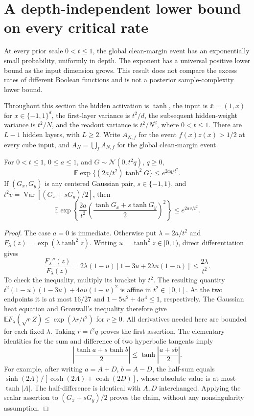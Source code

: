 \section{A depth-independent lower bound on every critical rate}
\label{sec:critical-universal-baseline}

At every prior scale $0<t\le1$, the global clean-margin event has an
exponentially small probability, uniformly in depth. The exponent has a
universal positive lower bound as the input dimension grows. This result
does not compare the excess rates of different Boolean functions and is
not a posterior sample-complexity lower bound.

Throughout this section the hidden activation is $\tanh$, the input is
$\bar x=(1,x)$ for $x\in\{-1,1\}^d$, the first-layer variance is $t^2/d$,
the subsequent hidden-weight variance is $t^2/N$, and the readout variance
is $t^2/N^2$, where $0<t\le1$. There are $L-1$ hidden layers, with $L\ge2$.
Write $A_{N,f}$ for the event $f(x)z(x)>1/2$ at every cube input, and
$A_N=\bigcup_f A_{N,f}$ for the global clean-margin event.

\begin{lemma}
\label{lem:critical-exponential-potential}
For $0<t\le1$, $0\le a\le1$, and $G\sim\mathcal N(0,t^2q)$, $q\ge0$,
\[
 \mathbb E\exp\{(2a/t^2)\tanh^2G\}\le e^{2aq/t^2}.
\]
If $(G_x,G_y)$ is any centered Gaussian pair, $s\in\{-1,1\}$,
and $t^2v=\operatorname{Var}[(G_x+sG_y)/2]$, then
\[
 \mathbb E\exp\left\{\frac{2a}{t^2}\left(
       \frac{\tanh G_x+s\tanh G_y}{2}\right)^2\right\}
 \le e^{2av/t^2}.
\]
\end{lemma}

\begin{proof}
The case $a=0$ is immediate. Otherwise put $\lambda=2a/t^2$ and
$F_\lambda(z)=\exp(\lambda\tanh^2z)$. Writing
$u=\tanh^2z\in[0,1)$, direct differentiation gives
\[
 \frac{F_\lambda''(z)}{F_\lambda(z)}
 =2\lambda(1-u)[1-3u+2\lambda u(1-u)]\le\frac{2\lambda}{t^2}.
\]
To check the inequality, multiply its bracket by $t^2$. The resulting
quantity $t^2(1-u)(1-3u)+4a u(1-u)^2$ is affine in $t^2\in[0,1]$.
At the two endpoints it is at most $16/27$ and
$1-5u^2+4u^3\le1$, respectively.
The Gaussian heat equation and Gronwall's inequality therefore give
$\mathbb E F_\lambda(\sqrt r Z)\le\exp(\lambda r/t^2)$ for $r\ge0$.
All derivatives needed here are bounded for each fixed $\lambda$.
Taking $r=t^2q$ proves the first assertion.
The elementary identities for the sum and difference of two hyperbolic
tangents imply
\[
 \left|\frac{\tanh a+s\tanh b}{2}\right|
 \le\tanh\left|\frac{a+sb}{2}\right|.
\]
For example, after writing $a=A+D$, $b=A-D$, the half-sum equals
$\sinh(2A)/[\cosh(2A)+\cosh(2D)]$, whose absolute value is at most
$\tanh|A|$. The half-difference is identical with $A,D$ interchanged.
Applying the scalar assertion to $(G_x+sG_y)/2$ proves the claim,
without any nonsingularity assumption.
\end{proof}

